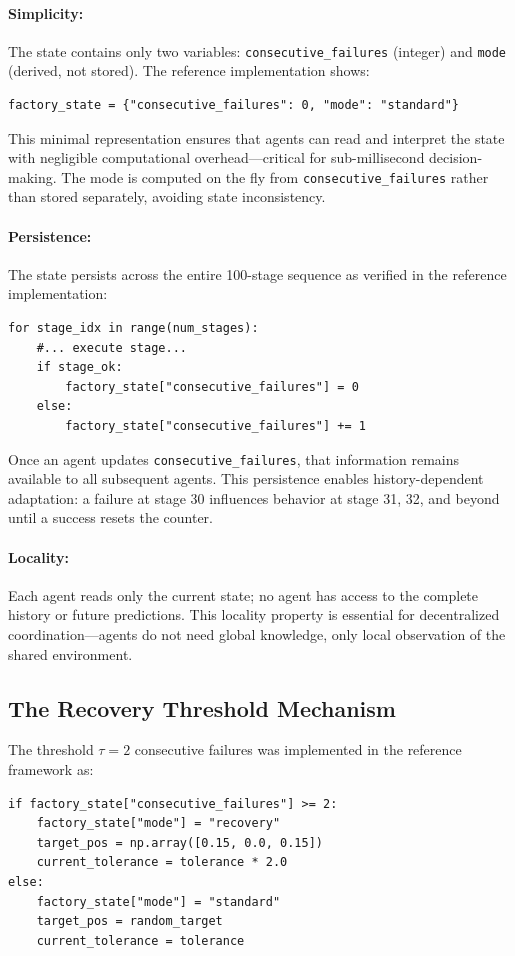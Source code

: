 \documentclass[12pt,a4paper,oneside]{report}
\begin{document}
\paragraph{Simplicity:} The state contains only two variables: \texttt{consecutive\_failures} (integer) and \texttt{mode} (derived, not stored). The reference implementation shows:
\begin{verbatim}
factory_state = {"consecutive_failures": 0, "mode": "standard"}
\end{verbatim}
This minimal representation ensures that agents can read and interpret the state with negligible computational overhead---critical for sub-millisecond decision-making. The mode is computed on the fly from \texttt{consecutive\_failures} rather than stored separately, avoiding state inconsistency.

\paragraph{Persistence:} The state persists across the entire 100-stage sequence as verified in the reference implementation:
\begin{verbatim}
for stage_idx in range(num_stages):
    #... execute stage...
    if stage_ok:
        factory_state["consecutive_failures"] = 0
    else:
        factory_state["consecutive_failures"] += 1
\end{verbatim}

Once an agent updates \texttt{consecutive\_failures}, that information remains available to all subsequent agents. This persistence enables history-dependent adaptation: a failure at stage 30 influences behavior at stage 31, 32, and beyond until a success resets the counter.

\paragraph{Locality:} Each agent reads only the current state; no agent has access to the complete history or future predictions. This locality property is essential for decentralized coordination---agents do not need global knowledge, only local observation of the shared environment.

\subsection{The Recovery Threshold Mechanism}

The threshold $\tau = 2$ consecutive failures was implemented in the reference framework as:
\begin{verbatim}
if factory_state["consecutive_failures"] >= 2:
    factory_state["mode"] = "recovery"
    target_pos = np.array([0.15, 0.0, 0.15])
    current_tolerance = tolerance * 2.0
else:
    factory_state["mode"] = "standard"
    target_pos = random_target
    current_tolerance = tolerance
\end{verbatim}
\end{document}
